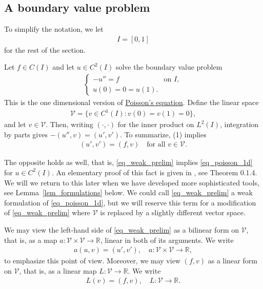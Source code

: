 \documentclass[12pt,oneside]{amsart}
\def\R{\mathbb R}
\begin{document}
\subsection{A boundary value problem}

To simplify the notation, we let
    \begin{align*}
I = [0,1]
    \end{align*}
for the rest of the section.

Let $f \in C(I)$ and let $u \in C^2(I)$ solve the boundary value problem 
\begin{align}\label{eq_poisson_1d}
\begin{cases}
-u'' = f & \text{on $I$},
\\
u(0) = 0 = u(1).
\end{cases}\end{align}
This is the one dimensional version of \href{https://en.wikipedia.org/wiki/Poisson's_equation}{Poisson's equation}. Define the linear space
    \begin{align}\label{def_wrong_V}
\mathcal V = \{ v \in C^1(I) : v(0) = v(1) = 0 \},
    \end{align}
and let $v \in \mathcal V$. Then, writing $(\cdot, \cdot)$ for the inner product on $L^2(I)$, integration by parts gives $-(u'', v) = (u', v')$. To summarize, (1) implies
\begin{align}\label{eq_weak_prelim}
(u', v') = (f, v) \quad \text{for all $v \in \mathcal V$}. 
\end{align}

The opposite holds as well, that is, \eqref{eq_weak_prelim} implies \eqref{eq_poisson_1d} for $u \in C^2(I)$.
An elementary proof of this fact is given in \cite{BS}, see Theorem 0.1.4. We will we return to this later when we have developed more sophisticated tools, see Lemma~\ref{lem_formulations} below.
We could call \eqref{eq_weak_prelim} a weak formulation of \eqref{eq_poisson_1d}, but we will reserve this term for a modification of \eqref{eq_weak_prelim} where $\mathcal V$ is replaced by a slightly different vector space.  

We may view the left-hand side of \eqref{eq_weak_prelim} as a bilinear form on $\mathcal V$, that is, as a map $a: \mathcal V \times \mathcal V \to \R$, linear in both of its arguments.
We write  
    \begin{align}\label{def_a}
a(u, v) = (u', v'), \quad a : \mathcal V \times \mathcal V \to \mathbb R,
    \end{align}
to emphasize this point of view.   
Moreover, we may view $(f, v)$ as a linear form on $\mathcal V$, that is, as a linear map $L : \mathcal V \to \R$. We write 
    \begin{align}\label{def_L}
L(v) = (f,v), \quad L : \mathcal V \to \R.
    \end{align}
\end{document}
